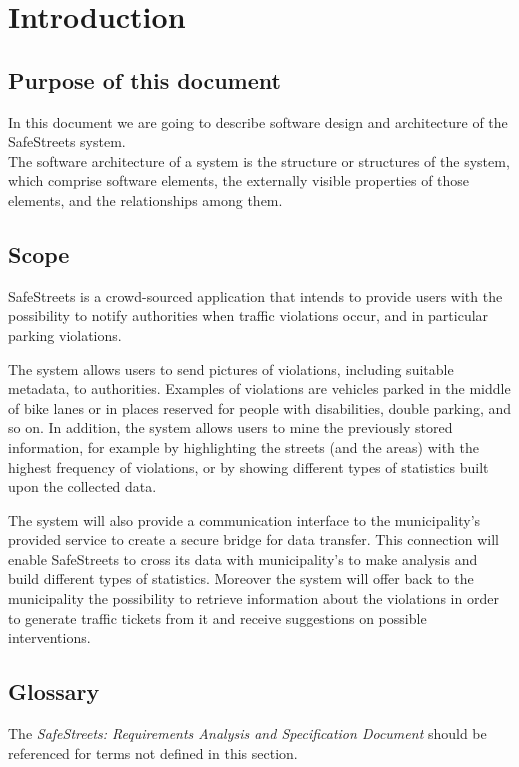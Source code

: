 \setlength{\parindent}{4ex}
\setlength{\parskip}{1ex}

\section{Introduction}
\subsection{Purpose of this document}
In this document we are going to describe software design and architecture of the SafeStreets system.\\
The software architecture of a system is the structure or structures of the system, which comprise software elements, the externally visible properties of those elements, and the relationships among them.\cite{SoftwareArch}

\subsection{Scope}
SafeStreets is a crowd-­sourced application that intends to provide users with the possibility to notify authorities when traffic violations occur, and in particular parking violations. 
	
	The system allows users to send pictures of violations, including suitable metadata, to authorities. Examples of violations are vehicles parked in the middle of bike lanes or in places reserved for people with disabilities, double parking, and so on. In addition, the system allows users to mine the previously stored information, for example by highlighting the streets (and the areas) with the highest frequency of violations, or by showing different types of statistics built upon the collected data.
	
	The system will also provide a communication interface to the municipality's provided service to create a secure bridge for data transfer. This connection will enable SafeStreets to cross its data with municipality's to make analysis and build different types of statistics. Moreover the system will offer back to the municipality the possibility to retrieve information about the violations in order to generate traffic tickets from it and receive suggestions on possible interventions.\cite{Assignments}
\subsection{Glossary}
The \emph{SafeStreets: Requirements Analysis and Specification Document}\cite{RASD} should be referenced for terms not defined in this section.

